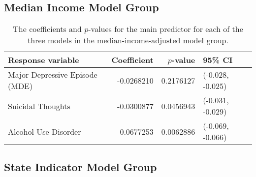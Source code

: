 \documentclass{article}
\begin{document}
\subsection{Median Income Model Group}

\begin{table}[!htb]
\begin{center}
\begin{tabular}{l r r l}
    \hline
    Response variable & Coefficient & $p$-value & 95\% CI\\
    \hline
    Major Depressive Episode (MDE) & -0.0268210 & 0.2176127 & (-0.028, -0.025)\\
    \hline
    Suicidal Thoughts & -0.0300877 & 0.0456943 & (-0.031, -0.029)\\
    \hline
    Alcohol Use Disorder & -0.0677253 & 0.0062886 & (-0.069, -0.066)\\
    \hline
\end{tabular}
\caption{\label{tab:median-income-model-results} The coefficients and $p$-values
    for the main predictor for each of the three models
    in the median-income-adjusted model group.
}
\end{center}
\end{table}

\subsection{State Indicator Model Group}
\end{document}
